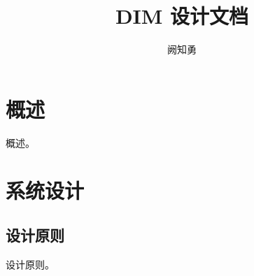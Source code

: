 \documentclass{utart}
\title{DIM 设计文档}
\author{阙知勇}
\begin{document}
\utMakeTitle{}


\utMakeTOC

\section{概述}

概述。

\section{系统设计}

    \subsection{设计原则}

        设计原则。
\end{document}
